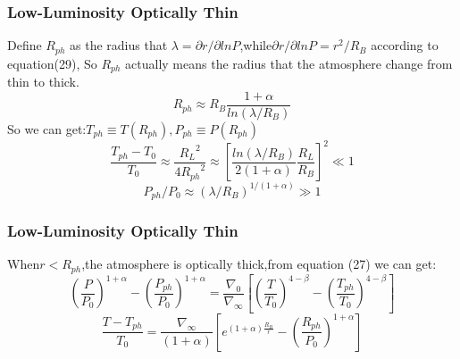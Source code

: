 \documentclass{beamer}
\begin{document}
\begin{frame}
\frametitle{Low-Luminosity Optically Thin}
Define $R_{ph}$ as the radius that $\lambda = \partial r/\partial ln P$,while$\partial r/\partial ln P=r^2/R_B$ according to equation(29), So $R_{ph}$ actually means the radius that the atmosphere change from thin to thick.
\begin{equation}
R_{ph} \approx R_B \frac{1+\alpha}{ln(\lambda /R_B)}
\end{equation}
So we can get:$T_{ph} \equiv T(R_{ph}),P_{ph} \equiv P(R_{ph})$
\begin{equation}
\frac{T_{ph}-T_0}{T_0} \approx \frac{{R_L}^2}{4 {R_{ph}}^2} \approx  [\frac{ln(\lambda/R_B)}{2(1+\alpha)}\frac{R_L}{R_B}]^2 \ll 1
\end{equation}
\begin{equation}
P_{ph}/P_0 \approx (\lambda/R_B)^{1/(1+\alpha)} \gg 1
\end{equation}
\end{frame}

\begin{frame}
\frametitle{Low-Luminosity Optically Thin}
When$r< R_{ph}$,the atmosphere is optically thick,from equation (27) we can get:
\begin{equation}
(\frac{P}{P_0})^{1+\alpha}-(\frac{P_{ph}}{P_0})^{1+\alpha}=\frac{\nabla_0}{\nabla_{\infty}}
[(\frac{T}{T_0})^{4-\beta}-(\frac{T_{ph}}{T_0})^{4-\beta}]
\end{equation}
\begin{equation}
\frac{T-T_{ph}}{T_0}=\frac{\nabla_{\infty}}{(1+\alpha)}
[e^{(1+\alpha)\frac{R_B}{r}}-(\frac{R_{ph}}{P_0})^{1+\alpha}]
\end{equation}
\end{frame}
\end{document}
